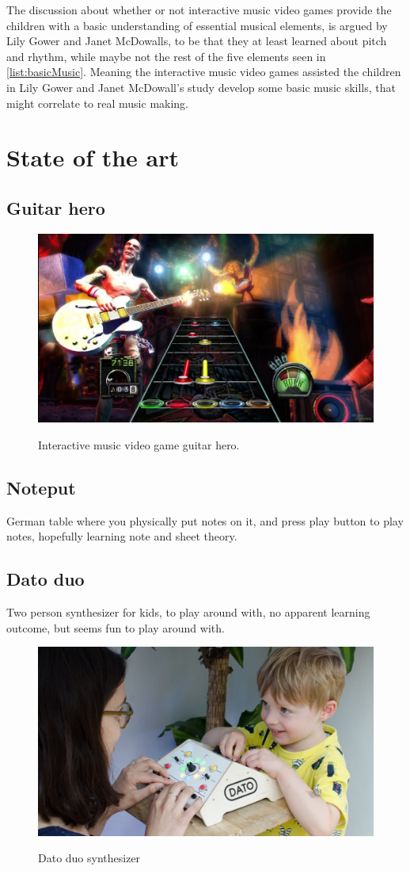 	The discussion about whether or not interactive music video games provide the children with a basic understanding of essential musical elements, is argued by Lily Gower and Janet McDowalls, to be that they at least learned about pitch and rhythm, while maybe not the rest of the five elements seen in \autoref{list:basicMusic}. Meaning the interactive music video games assisted the children in Lily Gower and Janet McDowall's study develop some basic music skills, that might correlate to real music making.

\section{State of the art}\label{sec:sota}
	\subsection{Guitar hero}\label{sec:guitarHero}
		\begin{figure}[H]
			\centering
			\includegraphics[width=0.7\linewidth]{figure/Analysis/guitarhero}
			\label{fig:guitarHero}
			\caption{Interactive music video game guitar hero.}
		\end{figure}
	\subsection{Noteput}
		German table where you physically put notes on it, and press play button to play notes, hopefully learning note and sheet theory.
	\subsection{Dato duo}
		Two person synthesizer for kids, to play around with, no apparent learning outcome, but seems fun to play around with.
		\begin{figure}[H]
			\centering
			\includegraphics[width=0.7\linewidth]{figure/Analysis/datoduo}
			\label{fig:datoduo}
			\caption{Dato duo synthesizer}
		\end{figure}
